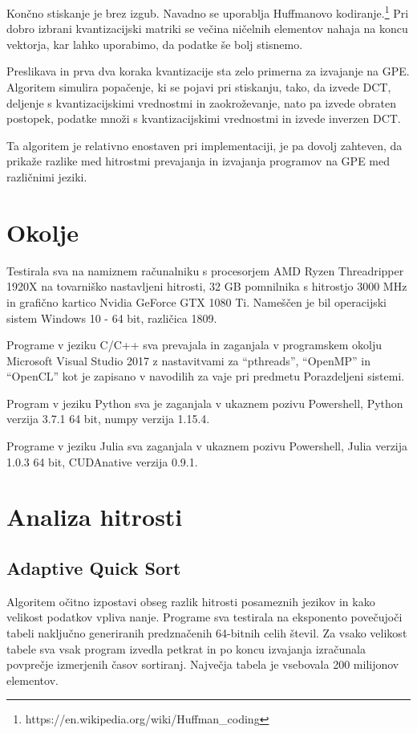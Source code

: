 \documentclass[journal,a4paper,twoside]{sty/IEEEtran}
\begin{document}
Končno stiskanje je brez izgub.
Navadno se uporablja Huffmanovo kodiranje.\footnote{https://en.wikipedia.org/wiki/Huffman\_coding}
Pri dobro izbrani kvantizacijski matriki se večina ničelnih elementov nahaja na koncu vektorja, kar lahko uporabimo, da podatke še bolj stisnemo.

Preslikava in prva dva koraka kvantizacije sta zelo primerna za izvajanje na GPE.
Algoritem simulira popačenje, ki se pojavi pri stiskanju, tako, da izvede DCT, deljenje s kvantizacijskimi vrednostmi in zaokroževanje, nato pa izvede
	obraten postopek, podatke množi s kvantizacijskimi vrednostmi in izvede inverzen DCT.

Ta algoritem je relativno enostaven pri implementaciji, je pa dovolj zahteven, da prikaže razlike med hitrostmi prevajanja in izvajanja programov na GPE
	med različnimi jeziki.

\section{Okolje}

Testirala sva na namiznem računalniku s procesorjem AMD Ryzen Threadripper 1920X na tovarniško nastavljeni hitrosti, 32 GB pomnilnika s hitrostjo
	3000 MHz in grafično kartico Nvidia GeForce GTX 1080 Ti.
Nameščen je bil operacijski sistem Windows 10 - 64 bit, različica 1809.

Programe v jeziku C/C++ sva prevajala in zaganjala v programskem okolju Microsoft Visual Studio 2017 z nastavitvami za “pthreads”, “OpenMP” in “OpenCL”
	kot je zapisano v navodilih za vaje pri predmetu Porazdeljeni sistemi.

Program v jeziku Python sva je zaganjala v ukaznem pozivu Powershell, Python verzija 3.7.1 64 bit, numpy verzija 1.15.4.

Programe v jeziku Julia sva zaganjala v ukaznem pozivu Powershell, Julia verzija 1.0.3 64 bit, CUDAnative verzija 0.9.1.

\section{Analiza hitrosti}

\subsection{Adaptive Quick Sort}

Algoritem očitno izpostavi obseg razlik hitrosti posameznih jezikov in kako velikost podatkov vpliva nanje.
Programe sva testirala na eksponento povečujoči tabeli naključno generiranih predznačenih 64-bitnih celih števil.
Za vsako velikost tabele sva vsak program izvedla petkrat in po koncu izvajanja izračunala povprečje izmerjenih časov sortiranj. 
Največja tabela je vsebovala 200 milijonov elementov.
\end{document}

